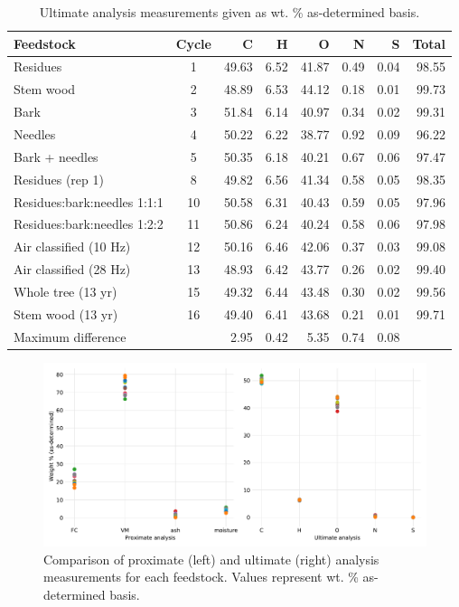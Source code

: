 \begin{table}[H]
    \caption{Ultimate analysis measurements given as wt. \% as-determined basis.}
    \label{tab:ultimate}
    \centering
    \begin{tabular}{lcrrrrrr}
        \toprule
        Feedstock & Cycle & C & H & O & N & S & Total \\
        \midrule
        Residues                    & 1  & 49.63 & 6.52 & 41.87 & 0.49 & 0.04 & 98.55 \\
        Stem wood                   & 2  & 48.89 & 6.53 & 44.12 & 0.18 & 0.01 & 99.73 \\
        Bark                        & 3  & 51.84 & 6.14 & 40.97 & 0.34 & 0.02 & 99.31 \\
        Needles                     & 4  & 50.22 & 6.22 & 38.77 & 0.92 & 0.09 & 96.22 \\
        Bark + needles              & 5  & 50.35 & 6.18 & 40.21 & 0.67 & 0.06 & 97.47 \\
        Residues (rep 1)            & 8  & 49.82 & 6.56 & 41.34 & 0.58 & 0.05 & 98.35 \\
        Residues:bark:needles 1:1:1 & 10 & 50.58 & 6.31 & 40.43 & 0.59 & 0.05 & 97.96 \\
        Residues:bark:needles 1:2:2 & 11 & 50.86 & 6.24 & 40.24 & 0.58 & 0.06 & 97.98 \\
        Air classified (10 Hz)      & 12 & 50.16 & 6.46 & 42.06 & 0.37 & 0.03 & 99.08 \\
        Air classified (28 Hz)      & 13 & 48.93 & 6.42 & 43.77 & 0.26 & 0.02 & 99.40 \\
        Whole tree (13 yr)          & 15 & 49.32 & 6.44 & 43.48 & 0.30 & 0.02 & 99.56 \\
        Stem wood (13 yr)           & 16 & 49.40 & 6.41 & 43.68 & 0.21 & 0.01 & 99.71 \\
        \cmidrule{3-7}
        \multicolumn{2}{l}{Maximum difference} & 2.95 & 0.42 & 5.35 & 0.74 & 0.08 & \\
        \bottomrule
    \end{tabular}
\end{table}

\begin{figure}[H]
    \centering
    \includegraphics[width=\textwidth]{figures/prox-ult-analysis.pdf}
    \caption{Comparison of proximate (left) and ultimate (right) analysis measurements for each feedstock. Values represent wt. \% as-determined basis.}
    \label{fig:prox-ult-analysis}
\end{figure}


